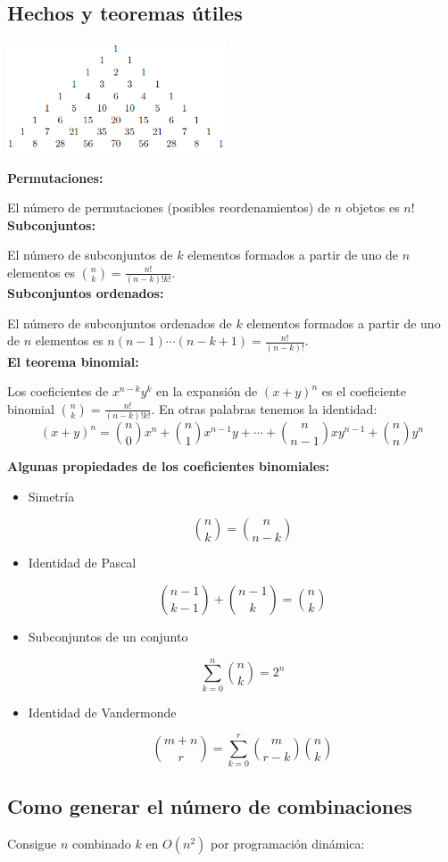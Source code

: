 \subsection{Hechos y teoremas \'utiles}
\begin{multicols}{2}
\begin{center}
\includegraphics[width=65mm]{./combinatory/pascal}
\end{center}
\textbf{Permutaciones:}

El n\'umero de permutaciones (posibles reordenamientos) de $n$ objetos es $n!$\\
\textbf{Subconjuntos:}

El n\'umero de subconjuntos de $k$ elementos formados a partir de uno de $n$ elementos es ${n \choose k} = \frac{n!}{(n-k)!k!}$.\\
\textbf{Subconjuntos ordenados:}

El n\'umero de subconjuntos ordenados de $k$ elementos formados a partir de uno de $n$ elementos es $n(n-1)\cdots (n-k+1)=\frac{n!}{(n-k)!}$.\\
\textbf{El teorema binomial:}

Los coeficientes de $x^{n-k}y^k$ en la expansi\'on de $(x+y)^n$ es el coeficiente binomial ${n \choose k} = \frac{n!}{(n-k)!k!}$. En otras palabras tenemos la identidad: \[ (x+y)^n =  {n \choose 0}x^n+{n \choose 1}x^{n-1}y+\cdots +{n \choose n-1}xy^{n-1}+{n \choose n}y^n \]

\textbf{Algunas propiedades de los coeficientes binomiales:}
\begin{itemize}
\item Simetr\'ia

\[{n \choose k} = {n \choose n-k}\]

\item Identidad de Pascal

\[{n-1 \choose k-1} + {n-1 \choose k} = {n \choose k}\]

\item Subconjuntos de un conjunto

\[\sum\limits_{k=0}^n{n \choose k} =  2^n\]

\item Identidad de Vandermonde

\[{m+n \choose r} = \sum\limits^r_{k=0}{m \choose r-k}{n \choose k}\]
\end{itemize}
\end{multicols}
\subsection{Como generar el n\'umero de combinaciones}
Consigue $n$ combinado $k$ en $O(n^2)$ por programaci\'on din\'amica:
